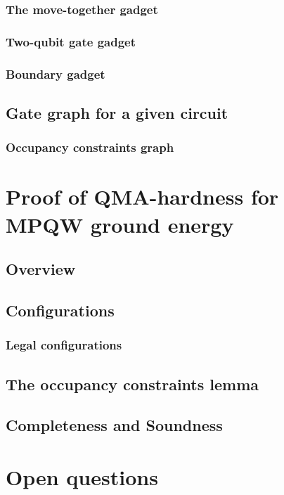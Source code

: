 \subsubsection{The move-together gadget}

\subsubsection{Two-qubit gate gadget}

\subsubsection{Boundary gadget}

\subsection{Gate graph for a given circuit}
\subsubsection{Occupancy constraints graph}

\section{Proof of QMA-hardness for MPQW ground energy}

\subsection{Overview}

\subsection{Configurations}

\subsubsection{Legal configurations}

\subsection{The occupancy constraints lemma}

\subsection{Completeness and Soundness}

\section{Open questions}